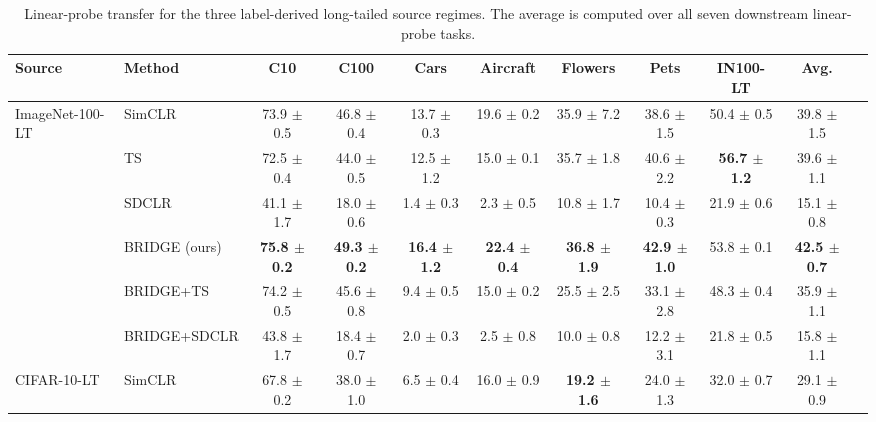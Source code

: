\begin{table}[t]
\centering
\tiny
\setlength{\tabcolsep}{3.0pt}
\caption{Linear-probe transfer for the three label-derived long-tailed source regimes. The average is computed over all seven downstream linear-probe tasks.}
\label{tab:main_sota_label_sources}
\begin{adjustbox}{max width=\textwidth}
\begin{tabular}{l l c c c c c c c c c}
\toprule
Source & Method & C10 & C100 & Cars & Aircraft & Flowers & Pets & IN100-LT & Avg. \\
\midrule
ImageNet-100-LT & SimCLR & 73.9 {\scriptsize$\pm$ 0.5} & 46.8 {\scriptsize$\pm$ 0.4} & 13.7 {\scriptsize$\pm$ 0.3} & 19.6 {\scriptsize$\pm$ 0.2} & 35.9 {\scriptsize$\pm$ 7.2} & 38.6 {\scriptsize$\pm$ 1.5} & 50.4 {\scriptsize$\pm$ 0.5} & 39.8 {\scriptsize$\pm$ 1.5} \\
 & TS & 72.5 {\scriptsize$\pm$ 0.4} & 44.0 {\scriptsize$\pm$ 0.5} & 12.5 {\scriptsize$\pm$ 1.2} & 15.0 {\scriptsize$\pm$ 0.1} & 35.7 {\scriptsize$\pm$ 1.8} & 40.6 {\scriptsize$\pm$ 2.2} & \textbf{56.7 {\scriptsize$\pm$ 1.2}} & 39.6 {\scriptsize$\pm$ 1.1} \\
 & SDCLR & 41.1 {\scriptsize$\pm$ 1.7} & 18.0 {\scriptsize$\pm$ 0.6} & 1.4 {\scriptsize$\pm$ 0.3} & 2.3 {\scriptsize$\pm$ 0.5} & 10.8 {\scriptsize$\pm$ 1.7} & 10.4 {\scriptsize$\pm$ 0.3} & 21.9 {\scriptsize$\pm$ 0.6} & 15.1 {\scriptsize$\pm$ 0.8} \\
 & \rowcolor{blue!10} BRIDGE (ours) & \textbf{75.8 {\scriptsize$\pm$ 0.2}} & \textbf{49.3 {\scriptsize$\pm$ 0.2}} & \textbf{16.4 {\scriptsize$\pm$ 1.2}} & \textbf{22.4 {\scriptsize$\pm$ 0.4}} & \textbf{36.8 {\scriptsize$\pm$ 1.9}} & \textbf{42.9 {\scriptsize$\pm$ 1.0}} & 53.8 {\scriptsize$\pm$ 0.1} & \textbf{42.5 {\scriptsize$\pm$ 0.7}} \\
 & BRIDGE+TS & 74.2 {\scriptsize$\pm$ 0.5} & 45.6 {\scriptsize$\pm$ 0.8} & 9.4 {\scriptsize$\pm$ 0.5} & 15.0 {\scriptsize$\pm$ 0.2} & 25.5 {\scriptsize$\pm$ 2.5} & 33.1 {\scriptsize$\pm$ 2.8} & 48.3 {\scriptsize$\pm$ 0.4} & 35.9 {\scriptsize$\pm$ 1.1} \\
 & BRIDGE+SDCLR & 43.8 {\scriptsize$\pm$ 1.7} & 18.4 {\scriptsize$\pm$ 0.7} & 2.0 {\scriptsize$\pm$ 0.3} & 2.5 {\scriptsize$\pm$ 0.8} & 10.0 {\scriptsize$\pm$ 0.8} & 12.2 {\scriptsize$\pm$ 3.1} & 21.8 {\scriptsize$\pm$ 0.5} & 15.8 {\scriptsize$\pm$ 1.1} \\
\midrule
CIFAR-10-LT & SimCLR & 67.8 {\scriptsize$\pm$ 0.2} & 38.0 {\scriptsize$\pm$ 1.0} & 6.5 {\scriptsize$\pm$ 0.4} & 16.0 {\scriptsize$\pm$ 0.9} & \textbf{19.2 {\scriptsize$\pm$ 1.6}} & 24.0 {\scriptsize$\pm$ 1.3} & 32.0 {\scriptsize$\pm$ 0.7} & 29.1 {\scriptsize$\pm$ 0.9} \\

\end{tabular}
\end{adjustbox}
\end{table}
